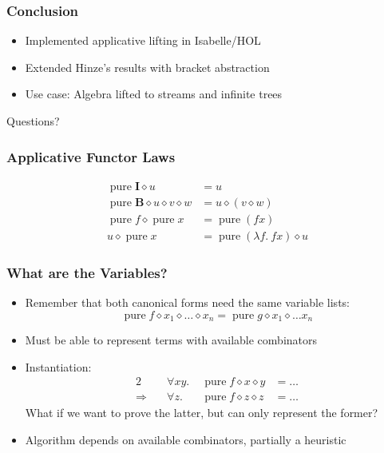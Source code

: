 \documentclass[smaller,leqno]{beamer}
\DeclareMathOperator{\pure}{pure}
\newcommand{\ap}{\diamond}
\begin{document}
\begin{frame}
\frametitle{Conclusion}
\begin{itemize}
\item Implemented applicative lifting in Isabelle/HOL
\item Extended Hinze's results with bracket abstraction
\item Use case: Algebra lifted to streams and infinite trees
\end{itemize}

\vspace{10mm}
\begin{center}\large Questions?\end{center}
\end{frame}

\appendix %

\begin{frame}
\frametitle{Applicative Functor Laws}

\begin{align*}
	\tag{identity} \pure{\mathbf{I}} \ap u &= u \\[1ex]
	\tag{composition} \pure{\mathbf{B}} \ap u \ap v \ap w &= u \ap (v \ap w) \\[1ex]
	\tag{homomorphism} \pure{f} \ap \pure x &= \pure{(f x)} \\[1ex]
	\tag{interchange} u \ap \pure{x} &= \pure{(\lambda f.\> f x)} \ap u
\end{align*}
\end{frame}

\begin{frame}
\frametitle{What are the Variables?}

\begin{itemize}
\item Remember that both canonical forms need the same variable lists:
\[ \pure f \ap x_1 \ap \dots \ap x_n = \pure g \ap x_1 \ap \dots x_n \]
\item Must be able to represent terms with available combinators
\item Instantiation:
\begin{alignat*}{2}
	& \forall x y. \; & \pure f \ap x \ap y &= \dots \\
	\Longrightarrow\quad & \forall z. \; & \pure f \ap z \ap z &= \dots
\end{alignat*}
What if we want to prove the latter, but can only represent the former?
\item Algorithm depends on available combinators, partially a heuristic
\end{itemize}
\end{frame}
\end{document}
